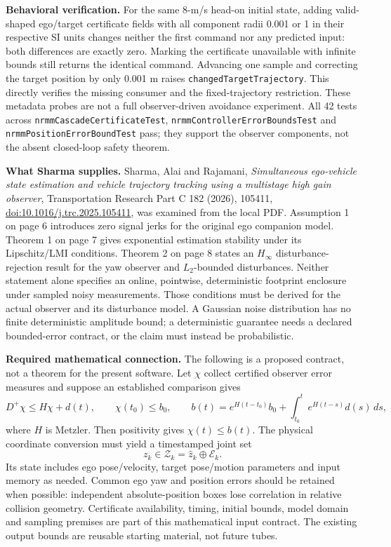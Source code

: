 \documentclass[10pt]{article}
\begin{document}
\textbf{Behavioral verification.} For the same 8-m/s head-on initial state,
adding valid-shaped ego/target certificate fields with all component radii
0.001 or 1 in their respective SI units changes neither the first command nor
any predicted input: both differences are exactly zero. Marking the certificate
unavailable with infinite bounds still returns the identical command. Advancing
one sample and correcting the target position by only 0.001 m raises
\texttt{changedTargetTrajectory}. This directly verifies the missing consumer
and the fixed-trajectory restriction. These metadata probes are not a full
observer-driven avoidance experiment. All 42 tests across
\texttt{nrmmCascadeCertificateTest}, \texttt{nrmmControllerErrorBoundsTest} and
\texttt{nrmmPositionErrorBoundTest} pass; they support the observer components,
not the absent closed-loop safety theorem.

\textbf{What Sharma supplies.} Sharma, Alai and Rajamani, \emph{Simultaneous
ego-vehicle state estimation and vehicle trajectory tracking using a multistage
high gain observer}, Transportation Research Part C 182 (2026), 105411,
\href{https://doi.org/10.1016/j.trc.2025.105411}{doi:10.1016/j.trc.2025.105411},
was examined from the local PDF. Assumption 1 on page 6 introduces zero signal
jerks for the original ego companion model. Theorem 1 on page 7 gives exponential
estimation stability under its Lipschitz/LMI conditions. Theorem 2 on page 8
states an $H_\infty$ disturbance-rejection result for the yaw observer and
$L_2$-bounded disturbances. Neither statement alone specifies an online,
pointwise, deterministic footprint enclosure under sampled noisy measurements.
Those conditions must be derived for the actual observer and its disturbance
model. A Gaussian noise distribution has no finite deterministic amplitude
bound; a deterministic guarantee needs a declared bounded-error contract, or
the claim must instead be probabilistic.

\textbf{Required mathematical connection.} The following is a proposed contract,
not a theorem for the present software. Let $\chi$ collect certified observer
error measures and suppose an established comparison gives
\[
 D^+\chi\le H\chi+d(t),\qquad \chi(t_0)\le b_0,
 \qquad
 b(t)=e^{H(t-t_0)}b_0+\int_{t_0}^t e^{H(t-s)}d(s)\,ds,
\]
where $H$ is Metzler. Then positivity gives $\chi(t)\le b(t)$. The physical
coordinate conversion must yield a timestamped joint set
\[
 z_k\in\mathcal Z_k=\hat z_k\oplus\mathcal E_k.
\]
Its state includes ego pose/velocity, target pose/motion parameters and input
memory as needed. Common ego yaw and position errors should be retained when
possible: independent absolute-position boxes lose correlation in relative
collision geometry. Certificate availability, timing, initial bounds, model
domain and sampling premises are part of this mathematical input contract.
The existing output bounds are reusable starting material, not future tubes.
\end{document}
